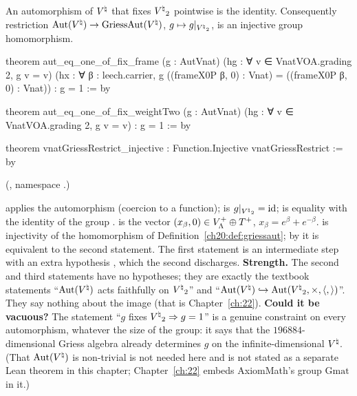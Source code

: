 \begin{theorem}\label{ch20:thm:faithful}
An automorphism of ${V^{\natural}}$ that fixes ${V^{\natural}}_2$ pointwise is the identity.  Consequently restriction
$\operatorname{Aut}({V^{\natural}})\to\mathrm{GriessAut}({V^{\natural}})$, $g\mapsto g|_{{V^{\natural}}_2}$, is an injective group homomorphism.
\end{theorem}
\begin{leancode}
theorem aut_eq_one_of_fix_frame (g : AutVnat) (hg : ∀ v ∈ VnatVOA.grading 2, g v = v)
    (hx : ∀ β : leech.carrier, g ((frameX0P β, 0) : Vnat) = ((frameX0P β, 0) : Vnat)) : g = 1 := by

theorem aut_eq_one_of_fix_weightTwo (g : AutVnat) (hg : ∀ v ∈ VnatVOA.grading 2, g v = v) :
    g = 1 := by

theorem vnatGriessRestrict_injective : Function.Injective vnatGriessRestrict := by
\end{leancode}
(, namespace .)
\begin{dictionary}
 applies the automorphism (coercion to a function);  is
$g|_{{V^{\natural}}_2}=\mathrm{id}$;  is equality with the identity of the group .
 is the vector $(x_\beta,0)\in V_{\Lambda}^{+}\oplus T^{+}$, $x_\beta=e^\beta+e^{-\beta}$.
 is injectivity of the homomorphism of
Definition~\ref{ch20:def:griessaut}; by  it is equivalent to the second statement.
The first statement is an intermediate step with an extra hypothesis , which the second discharges.
\textbf{Strength.}  The second and third statements have no hypotheses; they are exactly the textbook statements
``$\operatorname{Aut}({V^{\natural}})$ acts faithfully on ${V^{\natural}}_2$'' and ``$\operatorname{Aut}({V^{\natural}})\hookrightarrow\operatorname{Aut}({V^{\natural}}_2,\times,\langle,\rangle)$''.
They say nothing about the image (that is Chapter~\ref{ch:22}).  \textbf{Could it be vacuous?}  The statement ``$g$ fixes
${V^{\natural}}_2\Rightarrow g=1$'' is a genuine constraint on every automorphism, whatever the size of the group: it says that the
$196884$-dimensional Griess algebra already determines $g$ on the infinite-dimensional ${V^{\natural}}$.  (That $\operatorname{Aut}({V^{\natural}})$ is
non-trivial is not needed here and is not stated as a separate Lean theorem in this chapter; Chapter~\ref{ch:22} embeds
AxiomMath's group $\mathrm{Gmat}$ in it.)
\end{dictionary}

